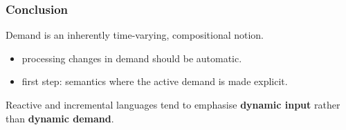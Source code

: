 \begin{frame}
\frametitle{Conclusion}
Demand is an inherently time-varying, compositional notion.
\begin{itemize}
\item \pause processing changes in demand should be automatic.
\item \pause first step: semantics where the active demand is made explicit.
\end{itemize}
\vspace{10pt}

\pause Reactive and incremental languages tend to emphasise \textbf{dynamic
  input} rather than \textbf{dynamic demand}.
\end{frame}
